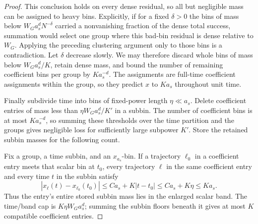\begin{proof}
This conclusion holds on every dense residual, so all but negligible
mass can be assigned to heavy bins.  Explicitly, if for a fixed
\(\delta>0\) the bins of mass below
\(W_Ga_s^dN^{-\delta}\) carried a nonvanishing fraction of the
dense total success, summation would select one group where this
bad-bin residual is dense relative to \(W_G\).  Applying the
preceding clustering argument only to those bins is a contradiction.
Let \(\delta\) decrease slowly.  We may therefore discard whole
bins of mass below \(W_Ga_s^d/K\), retain dense mass, and bound
the number of remaining coefficient bins per group by \(Ka_s^{-d}\).
The assignments are full-time coefficient assignments within the
group, so they predict \(x\) to \(Ka_s\) throughout unit time.

Finally subdivide time into bins of fixed-power length
\(\eta\ll a_s\).  Delete coefficient entries of mass less than
\(\eta W_Ga_s^d/K'\) in a subbin.  The number of coefficient
bins is at most \(Ka_s^{-d}\), so summing these thresholds over
the time partition and the groups gives negligible loss for
sufficiently large subpower \(K'\).  Store the retained subbin
masses for the following count.

Fix a group, a time subbin, and an \(x_{a_s}\)-bin.  If a
trajectory \(\ell_0\) in a coefficient entry meets that scalar
bin at \(t_0\), every trajectory \(\ell\) in the same
coefficient entry and every time \(t\) in the subbin satisfy
\[
 |x_\ell(t)-x_{\ell_0}(t_0)|
 \le Ca_s+K|t-t_0|\le Ca_s+K\eta\le Ka_s.
\]
Thus the entry's entire stored subbin mass lies in the enlarged
scalar band.  The time/band cap is \(K\eta W_Ga_s^d\);
summing the subbin floors beneath it gives at most \(K\)
compatible coefficient entries.

\end{proof}
